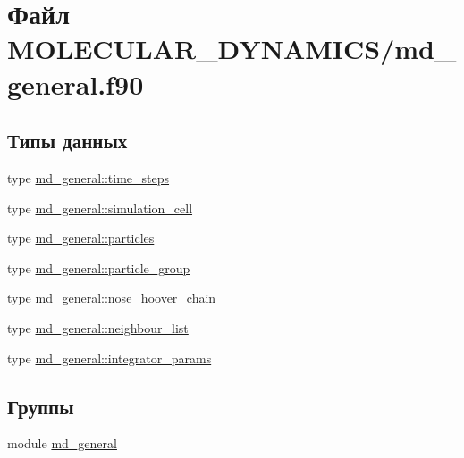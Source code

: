 \hypertarget{md__general_8f90}{}\section{Файл M\+O\+L\+E\+C\+U\+L\+A\+R\+\_\+\+D\+Y\+N\+A\+M\+I\+C\+S/md\+\_\+general.f90}
\label{md__general_8f90}
\subsection*{Типы данных}
\begin{DoxyCompactItemize}
\item 
type \mbox{\hyperlink{structmd__general_1_1time__steps}{md\+\_\+general\+::time\+\_\+steps}}
\item 
type \mbox{\hyperlink{structmd__general_1_1simulation__cell}{md\+\_\+general\+::simulation\+\_\+cell}}
\item 
type \mbox{\hyperlink{structmd__general_1_1particles}{md\+\_\+general\+::particles}}
\item 
type \mbox{\hyperlink{structmd__general_1_1particle__group}{md\+\_\+general\+::particle\+\_\+group}}
\item 
type \mbox{\hyperlink{structmd__general_1_1nose__hoover__chain}{md\+\_\+general\+::nose\+\_\+hoover\+\_\+chain}}
\item 
type \mbox{\hyperlink{structmd__general_1_1neighbour__list}{md\+\_\+general\+::neighbour\+\_\+list}}
\item 
type \mbox{\hyperlink{structmd__general_1_1integrator__params}{md\+\_\+general\+::integrator\+\_\+params}}
\end{DoxyCompactItemize}
\subsection*{Группы}
\begin{DoxyCompactItemize}
\item 
module \mbox{\hyperlink{namespacemd__general}{md\+\_\+general}}
\end{DoxyCompactItemize}

